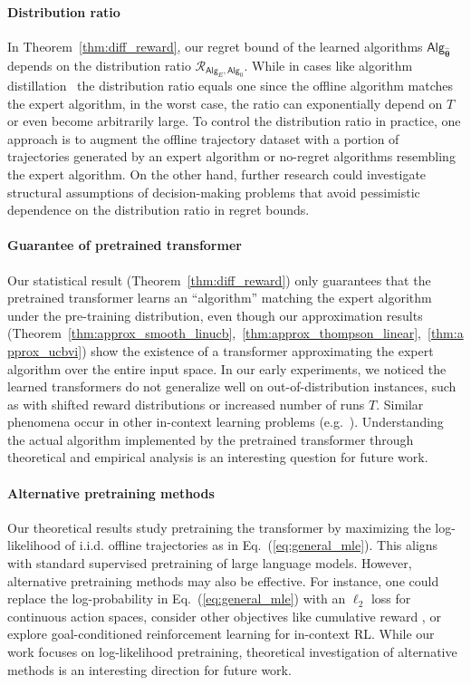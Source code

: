 \documentclass[10pt]{article}
\newcommand{\<}{\left\langle}
\renewcommand{\>}{\right\rangle}
\newcommand{\totlen}{{T}}
\newcommand{\sAlg}{{\mathsf{Alg}}}
\newcommand{\esttfpar}{{\widehat{\btheta}}}
\newcommand{\shortexp}{{E}}
\newcommand{\distratio}{{\mathcal{R}}}
\def\btheta{{\boldsymbol \theta}}
\begin{document}
\paragraph{Distribution ratio} In Theorem~\ref{thm:diff_reward}, our regret bound of the learned algorithms $\sAlg_{\esttfpar}$ depends on the distribution ratio $\distratio_{\sAlg_{\shortexp},\sAlg_0}$. While in cases like algorithm distillation~\citep{laskin2022context} the distribution ratio equals one since the offline algorithm matches the expert algorithm, in the worst case, the ratio can exponentially depend on $\totlen$ or even become arbitrarily large. To control the distribution ratio in practice, one approach is to augment the offline trajectory dataset with a portion of trajectories generated by an expert algorithm or no-regret algorithms resembling the expert algorithm. On the other hand, further research could investigate structural assumptions of decision-making problems that avoid pessimistic dependence on the distribution ratio in regret bounds.
\paragraph{Guarantee of pretrained transformer} Our statistical result (Theorem~\ref{thm:diff_reward}) only guarantees that the pretrained transformer learns an ``algorithm'' matching the expert algorithm under the pre-training distribution, even though our approximation results (Theorem~\ref{thm:approx_smooth_linucb},~\ref{thm:approx_thompson_linear},~\ref{thm:approx_ucbvi}) show the existence of a transformer approximating the expert algorithm over the entire input space. In our early experiments, we noticed the learned transformers do not generalize well on out-of-distribution instances, such as with shifted reward distributions or increased number of runs $\totlen$. Similar phenomena occur in other in-context learning problems (e.g.~\cite{garg2022can}). Understanding the actual algorithm implemented by the pretrained transformer through theoretical and empirical analysis is an interesting question for future work.
\paragraph{Alternative pretraining methods} Our theoretical results study pretraining the transformer by maximizing the log-likelihood of i.i.d. offline trajectories as in Eq.~(\ref{eq:general_mle}). This aligns with standard supervised pretraining of large language models. However, alternative pretraining methods may also be effective. For instance, one could replace the log-probability in Eq.~(\ref{eq:general_mle}) with an $\ell_2$ loss for continuous action spaces, consider other objectives like cumulative reward \citep{duan2016rl}, or explore goal-conditioned reinforcement learning \citep{chen2021decision} for in-context RL. While our work focuses on log-likelihood pretraining, theoretical investigation of alternative methods is an interesting direction for future work.
\end{document}
